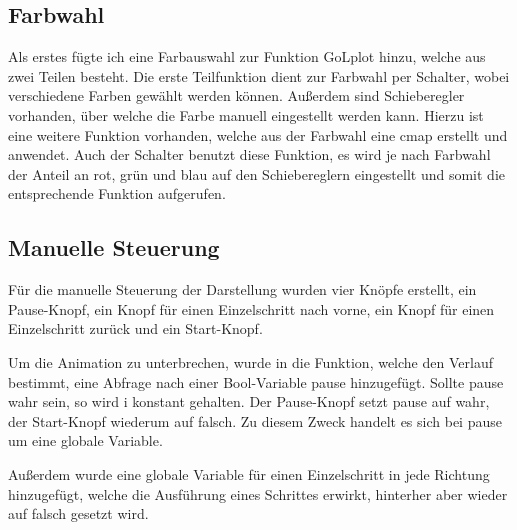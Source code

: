 \documentclass{scrartcl}
\begin{document}
\subsection{Farbwahl}
Als erstes fügte ich eine Farbauswahl zur Funktion GoLplot hinzu, welche aus zwei Teilen besteht. Die erste Teilfunktion dient zur Farbwahl per Schalter, wobei verschiedene Farben gewählt werden können. Außerdem sind Schieberegler vorhanden, über welche die Farbe manuell eingestellt werden kann. Hierzu ist eine weitere Funktion vorhanden, welche aus der Farbwahl eine cmap erstellt und anwendet. Auch der Schalter benutzt diese Funktion, es wird je nach Farbwahl der Anteil an rot, grün und blau auf den Schiebereglern eingestellt und somit die entsprechende Funktion aufgerufen.

\subsection{Manuelle Steuerung}
Für die manuelle Steuerung der Darstellung wurden vier Knöpfe erstellt, ein Pause-Knopf, ein Knopf für einen Einzelschritt nach vorne, ein Knopf für einen Einzelschritt zurück und ein Start-Knopf.

Um die Animation zu unterbrechen, wurde in die Funktion, welche den Verlauf bestimmt, eine Abfrage nach einer Bool-Variable pause hinzugefügt. Sollte pause wahr sein, so wird i konstant gehalten. Der Pause-Knopf setzt pause auf wahr, der Start-Knopf wiederum auf falsch. Zu diesem Zweck handelt es sich bei pause um eine globale Variable.

Außerdem wurde eine globale Variable für einen Einzelschritt in jede Richtung hinzugefügt, welche die Ausführung eines Schrittes erwirkt, hinterher aber wieder auf falsch gesetzt wird.
\end{document}
